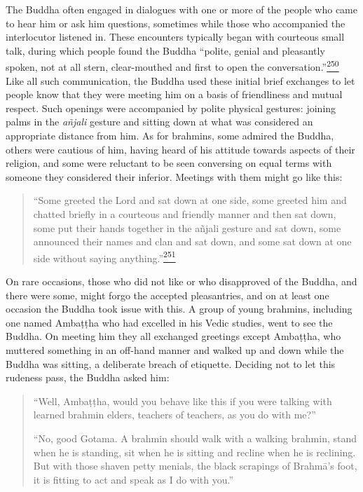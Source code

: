 The Buddha often engaged in dialogues with one or more of the people who
came to hear him or ask him questions, sometimes while those who
accompanied the interlocutor listened in. These encounters typically
began with courteous small talk, during which people found the Buddha
``polite, genial and pleasantly spoken, not at all stern, clear-mouthed
and first to open the
conversation.''\label{footprints_split_010.html_fnref250}\hyperref[footprints_split_024.htmlux5cux23fn250]{\textsuperscript{250}}
Like all such communication, the Buddha used these initial brief
exchanges to let people know that they were meeting him on a basis of
friendliness and mutual respect. Such openings were accompanied by
polite physical gestures: joining palms in the \emph{añjali} gesture and
sitting down at what was considered an appropriate distance from him. As
for brahmins, some admired the Buddha, others were cautious of him,
having heard of his attitude towards aspects of their religion, and some
were reluctant to be seen conversing on equal terms with someone they
considered their inferior. Meetings with them might go like this:

\begin{quote}
``Some greeted the Lord and sat down at one side, some greeted him and
chatted briefly in a courteous and friendly manner and then sat down,
some put their hands together in the añjali gesture and sat down, some
announced their names and clan and sat down, and some sat down at one
side without saying
anything.''\label{footprints_split_010.html_fnref251}\hyperref[footprints_split_024.htmlux5cux23fn251]{\textsuperscript{251}}
\end{quote}

On rare occasions, those who did not like or who disapproved of the
Buddha, and there were some, might forgo the accepted pleasantries, and
on at least one occasion the Buddha took issue with this. A group of
young brahmins, including one named Ambaṭṭha who had excelled in his
Vedic studies, went to see the Buddha. On meeting him they all exchanged
greetings except Ambaṭṭha, who muttered something in an off-hand manner
and walked up and down while the Buddha was sitting, a deliberate breach
of etiquette. Deciding not to let this rudeness pass, the Buddha asked
him:

\begin{quote}
``Well, Ambaṭṭha, would you behave like this if you were talking with
learned brahmin elders, teachers of teachers, as you do with me?''

``No, good Gotama. A brahmin should walk with a walking brahmin, stand
when he is standing, sit when he is sitting and recline when he is
reclining. But with those shaven petty menials, the black scrapings of
Brahmā's foot, it is fitting to act and speak as I do with you.''
\end{quote}

